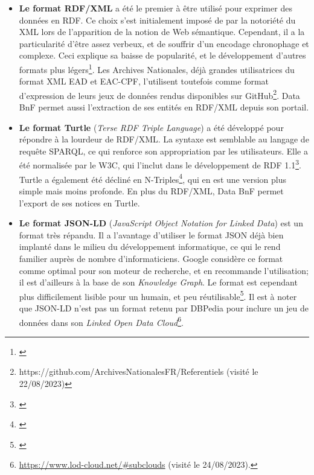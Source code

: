 \documentclass[a4paper,12pt,twoside]{book}
\begin{document}
\begin{itemize}
    \item \textbf{Le format RDF/XML} a été le premier à être utilisé pour exprimer des données en RDF. Ce choix s'est initialement imposé de par la notoriété du XML lors de l'apparition de la notion de Web sémantique. Cependant, il a la particularité d'être assez verbeux, et de souffrir d'un encodage chronophage et complexe. Ceci explique sa baisse de popularité, et le développement d'autres formats plus légers\footnote{\cite[p.~70]{vanhoolandIntroductionAuxHumanites2016}}. Les Archives Nationales, déjà grandes utilisatrices du format XML EAD et EAC-CPF, l'utilisent toutefois comme format d'expression de leurs jeux de données rendus disponibles sur GitHub\footnote{https://github.com/ArchivesNationalesFR/Referentiels (visité le 22/08/2023)}. Data BnF permet aussi l'extraction de ses entités en RDF/XML depuis son portail. 
    
    \item \textbf{Le format Turtle} (\textit{Terse RDF Triple Language}) a été développé pour répondre à la lourdeur de RDF/XML. La syntaxe est semblable au langage de requête SPARQL, ce qui renforce son appropriation par les utilisateurs. Elle a été normalisée par le W3C, qui l'inclut dans le développement de RDF 1.1\footnote{\cite{worldwidewebconsortiumRDFTurtleTerse2014}}. Turtle a également été décliné en N-Triples\footnote{\cite{worldwidewebconsortiumRDFNTriplesLinebased2014}}, qui en est une version plus simple mais moins profonde. En plus du RDF/XML, Data BnF permet l'export de ses notices en Turtle. 
    
    \item \textbf{Le format JSON-LD} (\textit{JavaScript Object Notation for Linked Data}) est un format très répandu. Il a l'avantage d'utiliser le format JSON déjà bien implanté dans le milieu du développement informatique, ce qui le rend familier auprès de nombre d'informaticiens. Google considère ce format comme optimal pour son moteur de recherche, et en recommande l'utilisation; il est d'ailleurs à la base de son \textit{Knowledge Graph}. Le format est cependant plus difficilement lisible pour un humain, et peu réutilisable\footnote{\cite[p.~158]{sireWebSemantiquePolitiques2018}}. Il est à noter que JSON-LD n'est pas un format retenu par DBPedia pour inclure un jeu de données dans son \textit{Linked Open Data Cloud}\footnote{\url{https://www.lod-cloud.net/\#subclouds} (visité le 24/08/2023).}. 
\end{itemize}
\end{document}

